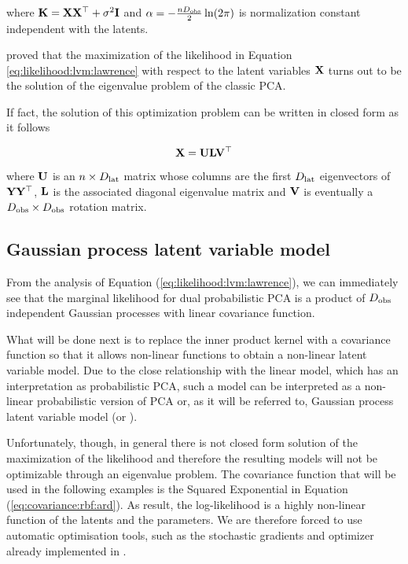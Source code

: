where $\mathbf{K} = \mathbf{X}\mathbf{X}^\top + \sigma^2\mathbf{I}$ and $\alpha = -\tfrac{nD_\mathrm{obs}}{2}\ln(2\pi)$ is normalization constant independent with the latents.

\citet{Lawrence2005} proved that the maximization of the likelihood in Equation \ref{eq:likelihood:lvm:lawrence} with respect to the latent variables $\mathbf{X}$ turns out to be the solution of the eigenvalue problem of the classic PCA.

If fact, the solution of this optimization problem can be written in closed form as it follows

\begin{equation}
    \label{eq:ppca:latent:solution}
    \mathbf{X} = \mathbf{U}\mathbf{L}\mathbf{V}^\top
\end{equation}

where $\mathbf{U}$ is an $n\times D_\mathrm{lat}$ matrix whose columns are the first $D_\mathrm{lat}$ eigenvectors of $\mathbf{Y}\mathbf{Y}^\top$, $\mathbf{L}$ is the associated diagonal eigenvalue matrix and $\mathbf{V}$ is eventually a $D_\mathrm{obs}\times D_\mathrm{obs}$ rotation matrix.

\subsection{Gaussian process latent variable model}

From the analysis of Equation (\ref{eq:likelihood:lvm:lawrence}), we can immediately see that the marginal likelihood for dual probabilistic PCA is a product of $D_\mathrm{obs}$ independent Gaussian processes with linear covariance function.

What will be done next is to replace the inner product kernel with a covariance function so that it allows non-linear functions to obtain a non-linear latent variable model. Due to the close relationship with the linear model, which has an interpretation as probabilistic PCA, such a model can be interpreted as a non-linear probabilistic version of PCA or, as it will be referred to, Gaussian process latent variable model (or \gplvm).

Unfortunately, though, in general there is not closed form solution of the maximization of the likelihood and therefore the resulting models will not be optimizable through an eigenvalue problem. The covariance function that will be used in the following examples is the Squared Exponential in Equation (\ref{eq:covariance:rbf:ard}). As result, the log-likelihood is a highly non-linear function of the latents and the parameters. We are therefore forced to use automatic optimisation tools, such as the stochastic gradients and \adam optimizer \citep{Kingma2015} already implemented in \tensorflow.

